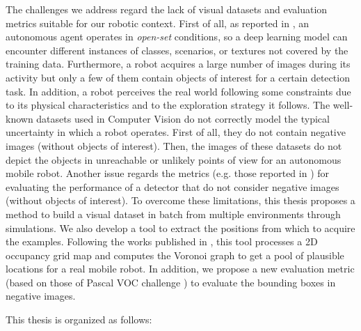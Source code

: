 The challenges we address regard the lack of visual datasets and evaluation metrics suitable for our robotic context. First of all, as reported in \cite{surveydeeplimits}, an autonomous agent operates in \textit{open-set} conditions, so a deep learning model can encounter different instances of classes, scenarios, or textures not covered by the training data. Furthermore, a robot acquires a large number of images during its activity but only a few of them contain objects of interest for a certain detection task. In addition, a robot perceives the real world following some constraints due to its physical characteristics and to the exploration strategy it follows. The well-known datasets used in Computer Vision \cite{coco, imagenet, pascal} do not correctly model the typical uncertainty in which a robot operates. First of all, they do not contain negative images (without objects of interest). Then, the images of these datasets do not depict the objects in unreachable or unlikely points of view for an autonomous mobile robot. Another issue regards the metrics (e.g. those reported in \cite{pascal, generalizediou, coco}) for evaluating the performance of a detector that do not consider negative images (without objects of interest). To overcome these limitations, this thesis proposes a method to build a visual dataset in batch from multiple environments through simulations. We also develop a tool to extract the positions from which to acquire the examples. Following the works published in \cite{repeatabilityslamarxiv, repeatabilityslam}, this tool processes a 2D occupancy grid map and computes the Voronoi graph to get a pool of plausible locations for a real mobile robot. In addition, we propose a new evaluation metric (based on those of Pascal VOC challenge \cite{pascal}) to evaluate the bounding boxes in negative images. 

This thesis is organized as follows:


